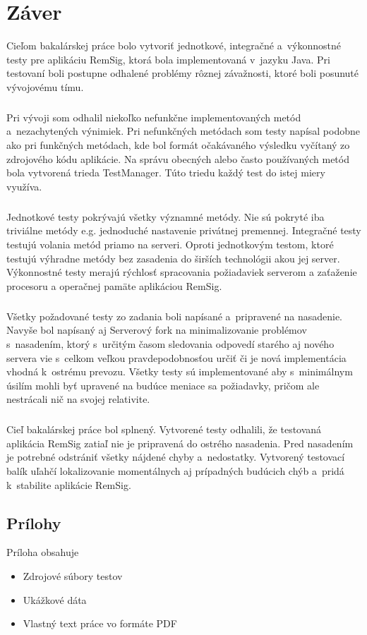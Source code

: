 \documentclass[
  printed, %
  table,   %
oneside,
  nolof,     %
  nolot,     %
]{fithesis3}
\begin{document}
\chapter{Záver}
Cieľom bakalárskej práce bolo vytvoriť jednotkové, integračné a~výkonnostné testy pre aplikáciu RemSig, ktorá bola implementovaná v~jazyku Java. Pri testovaní boli postupne odhalené problémy rôznej závažnosti, ktoré boli posunuté vývojovému tímu. \paragraph{}
Pri vývoji som odhalil niekoľko nefunkčne implementovaných metód a~nezachytených výnimiek. Pri nefunkčných metódach som testy napísal podobne ako pri funkčných metódach, kde bol formát očakávaného výsledku vyčítaný zo zdrojového kódu aplikácie. Na správu obecných alebo často používaných metód bola vytvorená trieda TestManager. Túto triedu každý test do istej miery využíva. \paragraph{} 
Jednotkové testy pokrývajú všetky významné metódy. Nie sú pokryté iba triviálne metódy e.g. jednoduché nastavenie privátnej premennej. Integračné testy testujú volania metód priamo na serveri. Oproti jednotkovým testom, ktoré testujú výhradne metódy bez zasadenia do širších technológii akou jej server. Výkonnostné testy merajú rýchlosť spracovania požiadaviek serverom a zaťaženie procesoru a operačnej pamäte aplikáciou RemSig.\paragraph{}
Všetky požadované testy zo zadania boli napísané a~pripravené na nasadenie. Navyše bol napísaný aj Serverový fork na minimalizovanie problémov s~nasadením, ktorý s~určitým časom sledovania odpovedí starého aj nového servera vie s~celkom veľkou pravdepodobnosťou určiť či je nová implementácia vhodná k~ostrému prevozu. Všetky testy sú  implementované aby s~minimálnym úsilím mohli byť upravené na budúce meniace sa požiadavky, pričom ale nestrácali nič na svojej relativite.\paragraph{}
Cieľ bakalárskej práce bol splnený. Vytvorené testy odhalili, že testovaná aplikácia RemSig zatiaľ nie je pripravená do ostrého nasadenia. Pred nasadením je potrebné odstrániť všetky nájdené chyby a~nedostatky. Vytvorený testovací balík uľahčí lokalizovanie momentálnych aj prípadných budúcich chýb a~pridá k~stabilite aplikácie RemSig.




\printbibliography

  

\begin{appendix}


\chapter{Prílohy}
Príloha obsahuje
\begin{itemize}
	\item Zdrojové súbory testov
	\item Ukážkové dáta 
	\item Vlastný text práce vo formáte PDF
\end{itemize}



\end{appendix}
\end{document}
